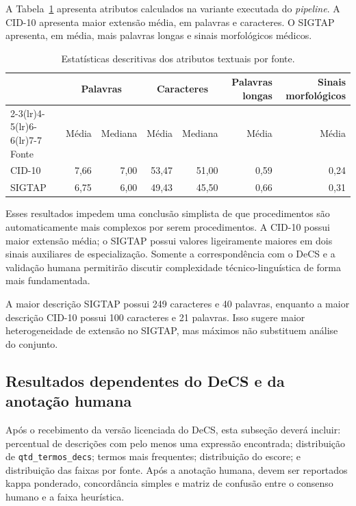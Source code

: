 \documentclass[12pt]{article}
\begin{document}
A Tabela~\ref{tab:descritivos} apresenta atributos calculados na variante
executada do \textit{pipeline}. A CID-10 apresenta maior extensão média, em
palavras e caracteres. O SIGTAP apresenta, em média, mais palavras longas e
sinais morfológicos médicos.

\begin{table}[ht]
\centering
\caption{Estatísticas descritivas dos atributos textuais por fonte.}
\label{tab:descritivos}
\begin{tabular}{lrrrrrr}
\toprule
& \multicolumn{2}{c}{Palavras} & \multicolumn{2}{c}{Caracteres} &
Palavras longas & Sinais morfológicos \\
\cmidrule(lr){2-3}\cmidrule(lr){4-5}\cmidrule(lr){6-6}\cmidrule(lr){7-7}
Fonte & Média & Mediana & Média & Mediana & Média & Média \\
\midrule
CID-10 & 7,66 & 7,00 & 53,47 & 51,00 & 0,59 & 0,24 \\
SIGTAP & 6,75 & 6,00 & 49,43 & 45,50 & 0,66 & 0,31 \\
\bottomrule
\end{tabular}
\end{table}

Esses resultados impedem uma conclusão simplista de que procedimentos são
automaticamente mais complexos por serem procedimentos. A CID-10 possui maior
extensão média; o SIGTAP possui valores ligeiramente maiores em dois sinais
auxiliares de especialização. Somente a correspondência com o DeCS e a
validação humana permitirão discutir complexidade técnico-linguística de
forma mais fundamentada.

A maior descrição SIGTAP possui 249 caracteres e 40 palavras, enquanto a
maior descrição CID-10 possui 100 caracteres e 21 palavras. Isso sugere
maior heterogeneidade de extensão no SIGTAP, mas máximos não substituem
análise do conjunto.

\subsection{Resultados dependentes do DeCS e da anotação humana}

Após o recebimento da versão licenciada do DeCS, esta subseção deverá
incluir: percentual de descrições com pelo menos uma expressão encontrada;
distribuição de \texttt{qtd\_termos\_decs}; termos mais frequentes;
distribuição do escore; e distribuição das faixas por fonte. Após a anotação
humana, devem ser reportados kappa ponderado, concordância simples e matriz
de confusão entre o consenso humano e a faixa heurística.
\end{document}

